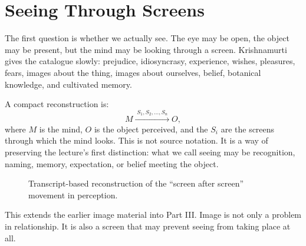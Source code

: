 \documentclass[11pt,oneside]{book}
\begin{document}
\section{Seeing Through Screens}

The first question is whether we actually see. The eye may be open, the object may be present, but the mind may be looking through a screen. Krishnamurti gives the catalogue slowly: prejudice, idiosyncrasy, experience, wishes, pleasures, fears, images about the thing, images about ourselves, belief, botanical knowledge, and cultivated memory.

A compact reconstruction is:
\begin{equation}
M \xrightarrow{\;S_1,S_2,\ldots,S_n\;} O,
\end{equation}
where \(M\) is the mind, \(O\) is the object perceived, and the \(S_i\) are the screens through which the mind looks. This is not source notation. It is a way of preserving the lecture's first distinction: what we call seeing may be recognition, naming, memory, expectation, or belief meeting the object.

\begin{figure}
\centering
{}

Transcript-based reconstruction of the ``screen after screen'' movement in perception.
\end{figure}

This extends the earlier image material into Part III. Image is not only a problem in relationship. It is also a screen that may prevent seeing from taking place at all.
\end{document}
